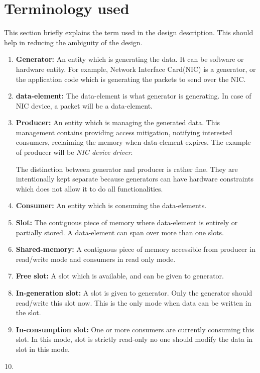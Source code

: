 \documentclass[a4paper,twoside]{report} %
\begin{document}
\section{Terminology used}
This section briefly explains the term used in the design 
description.  This should help in reducing the ambiguity of the design.
\begin{enumerate}
  \item \textbf{Generator:} An entity which is generating the data.  It
  can be software or hardware entity.  For example, Network
  Interface Card(NIC) is a generator, or the application code
  which is generating the packets to send over the NIC.
  \item \textbf{data-element:} The data-element is what generator 
  is generating. In case of NIC device, a packet will be a
  data-element.
  \item \textbf{Producer:} An entity which is managing the generated data.
  This management contains providing access mitigation, notifying
  interested consumers, reclaiming the memory when data-element
  expires.  The example of producer will be \textit{NIC device
  driver}.  


  The distinction between generator and producer is
  rather fine.  They are intentionally kept separate because
  generators can have hardware constraints which does not allow
  it to do all functionalities.
  \item \textbf{Consumer:} An entity which is consuming the data-elements. 
  \item \textbf{Slot:} The contiguous piece of memory where data-element is
  entirely or partially stored. A data-element can span over
  more than one slots. 
  \item \textbf{Shared-memory:} A contiguous piece of memory accessible 
   from producer in read/write mode and consumers in read only mode.
  \item \textbf{Free slot:} A slot which is available, and can be given
  to generator.
  \item \textbf{In-generation slot:} A slot is given to generator. Only 
  the generator should read/write this slot now.  This is the only
  mode when data can be written in the slot.
  \item \textbf{In-consumption slot:} One or more consumers are currently
  consuming this slot.  In this mode, slot is strictly read-only
  no one should modify the data in slot in this mode.
  \item  
\end{enumerate}
\end{document}

